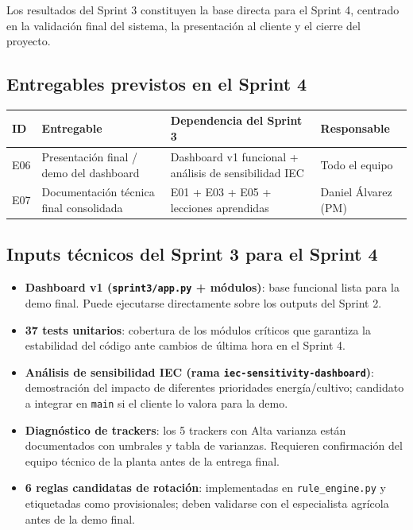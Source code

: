 \documentclass[11pt,a4paper]{article}
\begin{document}
Los resultados del Sprint 3 constituyen la base directa para el Sprint 4, centrado en la
validación final del sistema, la presentación al cliente y el cierre del proyecto.

\subsection{Entregables previstos en el Sprint 4}

\begin{longtable}{p{} p{} p{} p{}}
\textbf{ID} & \textbf{Entregable} & \textbf{Dependencia del Sprint 3} & \textbf{Responsable} \\
\hline
E06 & Presentación final / demo del dashboard & Dashboard v1 funcional + análisis de sensibilidad IEC & Todo el equipo \\
E07 & Documentación técnica final consolidada & E01 + E03 + E05 + lecciones aprendidas & Daniel Álvarez (PM) \\
\end{longtable}

\subsection{Inputs técnicos del Sprint 3 para el Sprint 4}

\begin{itemize}
  \item \textbf{Dashboard v1 (\texttt{sprint3/app.py} + módulos)}: base funcional lista para la demo
    final. Puede ejecutarse directamente sobre los outputs del Sprint 2.
  \item \textbf{37 tests unitarios}: cobertura de los módulos críticos que garantiza la estabilidad
    del código ante cambios de última hora en el Sprint 4.
  \item \textbf{Análisis de sensibilidad IEC (rama \texttt{iec-sensitivity-dashboard})}: demostración
    del impacto de diferentes prioridades energía/cultivo; candidato a integrar en \texttt{main}
    si el cliente lo valora para la demo.
  \item \textbf{Diagnóstico de trackers}: los 5 trackers con Alta varianza están documentados con
    umbrales y tabla de varianzas. Requieren confirmación del equipo técnico de la planta
    antes de la entrega final.
  \item \textbf{6 reglas candidatas de rotación}: implementadas en \texttt{rule\_engine.py} y etiquetadas
    como provisionales; deben validarse con el especialista agrícola antes de la demo final.
\end{itemize}
\end{document}
